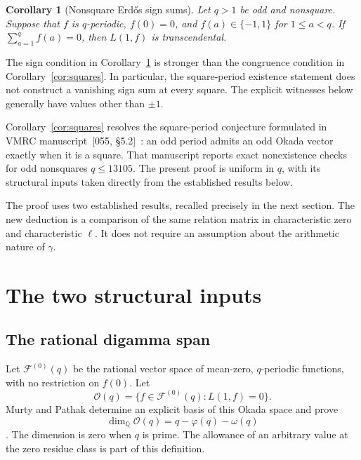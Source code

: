 \documentclass[11pt,a4paper]{article}
\newtheorem{corollary}[theorem]{Corollary}
\theoremstyle{definition}
\theoremstyle{remark}
\newcommand{\Q}{\mathbb Q}
\begin{document}
\begin{corollary}[Nonsquare Erd\H{o}s sign sums]\label{cor:erdos}
Let $q>1$ be odd and nonsquare. Suppose that $f$ is $q$-periodic,
$f(0)=0$, and $f(a)\in\{-1,1\}$ for $1\le a<q$. If
$\sum_{a=1}^{q}f(a)=0$, then $L(1,f)$ is transcendental.
\end{corollary}

The sign condition in Corollary~\ref{cor:erdos} is stronger than the
congruence condition in Corollary~\ref{cor:squares}. In particular,
the square-period existence statement does not construct a vanishing
sign sum at every square. The explicit witnesses below generally have
values other than $\pm1$.

Corollary~\ref{cor:squares} resolves the square-period conjecture
formulated in VMRC manuscript~[055, \S5.2]~\cite{VMRC055}: an odd
period admits an odd Okada vector exactly when it is a square.
That manuscript reports exact nonexistence checks for odd nonsquares
$q\le13105$. The present proof is uniform in $q$, with its structural
inputs taken directly from the established results below.

The proof uses two established results, recalled precisely in the next
section. The new deduction is a comparison of the same relation matrix
in characteristic zero and characteristic $\ell$. It does not require
an assumption about the arithmetic nature of $\gamma$.

\section{The two structural inputs}

\subsection{The rational digamma span}

Let $\mathcal F^{(0)}(q)$ be the rational vector space of mean-zero,
$q$-periodic functions, with no restriction on $f(0)$. Let
\[
 \mathcal O(q)=\{f\in\mathcal F^{(0)}(q):L(1,f)=0\}.
\]
Murty and Pathak determine an explicit basis of this Okada space and
prove
\begin{equation}\label{eq:okada-dimension}
 \dim_\Q\mathcal O(q)=q-\varphi(q)-\omega(q)
\end{equation}
\cite[\S2 and Theorem~4.4]{MurtyPathak}. The dimension is zero when
$q$ is prime. The allowance of an arbitrary value at the zero residue
class is part of this definition.
\end{document}
